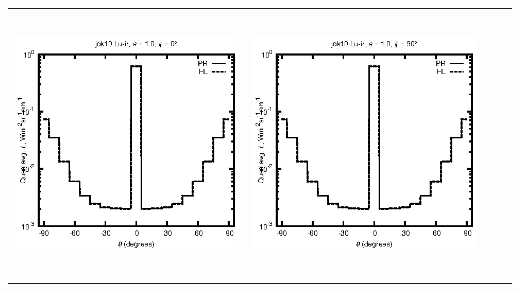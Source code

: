 \documentclass[10pt,a4paper]{article}
\begin{document}
\begin{adjustwidth}{-1.2in}{-1.2in}
\begin{tabular}{c c c c}
\includegraphics[height=7cm]{../eps/jok10_Lu_ir_fwd.eps} &
\includegraphics[height=7cm]{../eps/jok10_Lu_ir_cross.eps} \\
\end{tabular}

\end{adjustwidth}
\end{document}
